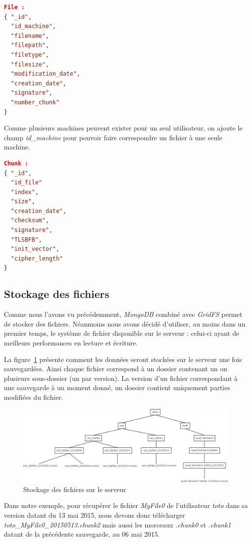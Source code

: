 \documentclass[a4paper,10pt, twoside]{report}
\begin{document}
\begin{spacing}{1.2}
\begin{lstlisting}[language=json]
File :
{ "_id",
  "id_machine",
  "filename",
  "filepath",
  "filetype",
  "filesize",
  "modification_date",
  "creation_date",
  "signature",
  "number_chunk"
}
\end{lstlisting}
Comme plusieurs machines peuvent exister pour un seul utilisateur, on ajoute
le champ \textit{id\_machine} pour pouvoir faire correspondre un fichier à
une seule machine.

\begin{lstlisting}[language=json]
Chunk :
{ "_id",
  "id_file"
  "index",
  "size",
  "creation_date",
  "checksum",
  "signature",
  "TLSBFB",
  "init_vector",
  "cipher_length"
}
\end{lstlisting}

\subsection{Stockage des fichiers}
Comme nous l'avons vu précédemment, \textit{MongoDB} combiné avec
\textit{GridFS} permet de stocker des fichiers. Néanmoins nous avons
décidé d'utiliser, au moins dans un premier temps, le système de fichier
disponible sur le serveur : celui-ci ayant de meilleurs performances en lecture
et écriture.

La figure~\ref{fileSystemServer} présente comment les données seront
stockées sur le serveur une fois sauvegardées. Ainsi chaque fichier
correspond à un dossier contenant un on plusieurs sous-dossier (un par
version). La version d'un fichier correspondant à une sauvegarde à un moment
donné, un dossier contient uniquement parties modifiées du fichier.

\begin{figure}[h!]
  \hspace{-4.5em}
  \includegraphics[width=19cm]{softwareDesign/fileSystemServer.png}
  \caption{\label{fileSystemServer} Stockage des fichiers sur le serveur}
\end{figure}

Dans notre exemple, pour récupérer le fichier \textit{MyFile0} de
l'utilisateur \textit{toto}  dans sa version datant du 13 mai 2015, nous devons
donc télécharger \textit{toto\_MyFile0\_20150513.chunk2} mais aussi les
morceaux \textit{.chunk0} et \textit{.chunk1} datant de la précédente
sauvegarde, au 06 mai 2015.


\end{spacing}
\end{document}
